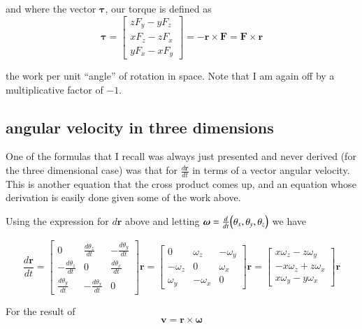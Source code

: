 \documentclass{article}      %
\newcommand{\D}[2] {\frac {d#2} {d#1}}
\newcommand{\Br}[0]{\mathbf{r}}
\newcommand{\Bv}[0]{\mathbf{v}}
\newcommand{\BF}[0]{\mathbf{F}}
\newcommand{\Btau}[0]{\boldsymbol{\tau}}
\newcommand{\Bomega}[0]{\boldsymbol{\omega}}
\newcommand{\cross}[0]{\times}
\begin{document}
and where the vector $\Btau$, our torque is defined as
\begin{equation*}
\Btau =
\begin{bmatrix}
z F_y - y F_z \\
x F_z - z F_x \\
y F_x - x F_y
\end{bmatrix}
=
-\Br \cross \BF
= \BF \cross \Br
\end{equation*}

the work per unit ``angle'' of rotation in space.  Note that I am again off by a multiplicative factor of $-1$.

\subsection{angular velocity in three dimensions}

One of the formulas that I recall was always just presented and never derived (for the three dimensional case)
was that for
$\D{t}{\Br}$ in terms of a vector angular velocity.  This is another equation that the cross product
comes up, and an equation whose derivation is easily done given some of the work above.

Using the expression for $d\Br$ above and letting $\Bomega = \D{t}{}\Bigl(\theta_x, \theta_y, \theta_z\Bigr)$ we have

\begin{equation*}
\D{t}{\Br}
=
\begin{bmatrix}
0 & \D{t}{\theta_z} & -\D{t}{\theta_y} \\
-\D{t}{\theta_z} & 0 & \D{t}{\theta_x} \\
\D{t}{\theta_y} & -\D{t}{\theta_x} & 0
\end{bmatrix} \Br
=
\begin{bmatrix}
0 & \omega_z & -\omega_y \\
-\omega_z & 0 & \omega_x \\
\omega_y & -\omega_x & 0
\end{bmatrix} \Br
=
\begin{bmatrix}
x \omega_z - z \omega_y \\
- x \omega_z + z \omega_x \\
x \omega_y - y \omega_x
\end{bmatrix} \Br
\end{equation*}

For the result of
\begin{equation*}
\Bv = \Br \cross \Bomega
\end{equation*}
\end{document}
